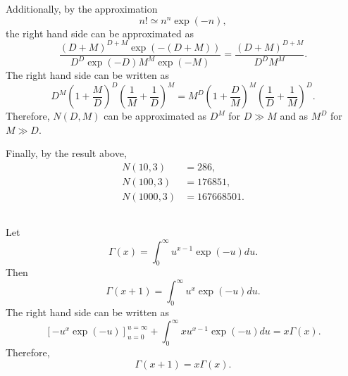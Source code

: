 Additionally, by the approximation
%
\begin{equation}
n!
\simeq
n ^ n
\exp(- n),
\end{equation}
%
the right hand side can be approximated as
%
\begin{equation}
\frac
{(D + M) ^ {D + M} 
\exp 
\left(
	- (D + M)
\right)}
{D ^ D \exp (- D) M ^ M \exp(- M)}
=
\frac{(D + M) ^ {D + M}}{D ^ D M ^ M}.
\end{equation}
%
The right hand side can be written as
%
\begin{equation}
D ^ M 
\left(
	1
	+
	\frac{M}{D}
\right) ^ D
\left(
	\frac{1}{M}
	+
	\frac{1}{D}
\right) ^ M
=
M ^ D 
\left(
	1
	+
	\frac{D}{M}
\right) ^ M
\left(
	\frac{1}{D}
	+
	\frac{1}{M}
\right) ^ D.
\end{equation}
%
Therefore, $N(D, M)$ can be approximated as $D ^ M$ for $D \gg M$ and as $M ^ D$ for $M \gg D$.

Finally, by the result above, 
%
\begin{equation}
\begin{aligned}
N(10, 3)
&=
286, \\
N(100, 3)
&=
176851, \\
N(1000, 3)
&=
167668501.
\end{aligned}
\end{equation}
%


\subsection{}
\label{1.17}
Let
%
\begin{equation}
\Gamma(x) 
= 
\int_{0}^{\infty} 
u ^ {x - 1} 
\exp(- u) 
du.
\end{equation}
%
Then
%
\begin{equation}
\Gamma(x + 1) 
= 
\int_{0}^{\infty} 
u ^ {x} 
\exp(- u) 
du.
\end{equation}
%
The right hand side can be written as 
%
\begin{equation}
\left[ 
	- u ^ x 
	\exp(- u) 
\right]_{u = 0}^{u = \infty} 
+ 
\int_{0}^{\infty} 
x 
u ^ {x - 1} 
\exp(- u) 
du 
= 
x 
\Gamma(x).
\end{equation}
%
Therefore,
%
\begin{equation}
\Gamma( x + 1) 
= 
x \Gamma(x).
\end{equation}
%

